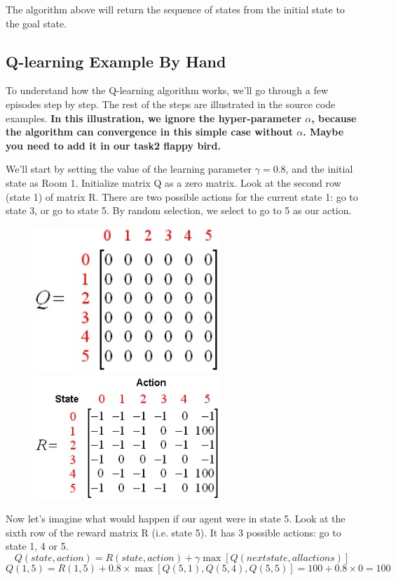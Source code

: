 \documentclass[a4paper, 11pt]{article}
\begin{document}
The algorithm above will return the sequence of states from the initial state to the goal state.
\subsection{Q-learning Example By Hand}
To understand how the Q-learning algorithm works, we'll go through a few episodes step by step. The rest of the steps are illustrated in the source code examples. \textbf{In this illustration, we ignore the hyper-parameter $\alpha$, because the algorithm can convergence in this simple case without $\alpha$. Maybe you need to add it in our task2 flappy bird.}

We'll start by setting the value of the learning parameter $\gamma=0.8$, and the initial state as Room 1. Initialize matrix Q as a zero matrix. Look at the second row (state 1) of matrix R.  There are two possible actions for the current state 1: go to state 3, or go to state 5. By random selection, we select to go to 5 as our action.

\begin{figure}[ht]
\centering
\includegraphics[width=7cm]{Pic/q_matrix1}
\quad
\includegraphics[width=7cm]{Pic/r_matrix1}
\end{figure}
Now let's imagine what would happen if our agent were in state 5.  Look at the sixth row of the reward matrix R (i.e. state 5).  It has 3 possible actions: go to state 1, 4 or 5.
$$Q(state, action) = R(state, action) + \gamma\max[Q(next state, all actions)]$$
$$Q(1, 5) = R(1, 5) + 0.8\times\max[Q(5, 1), Q(5, 4), Q(5, 5)] = 100 + 0.8\times 0 = 100$$
\end{document}
